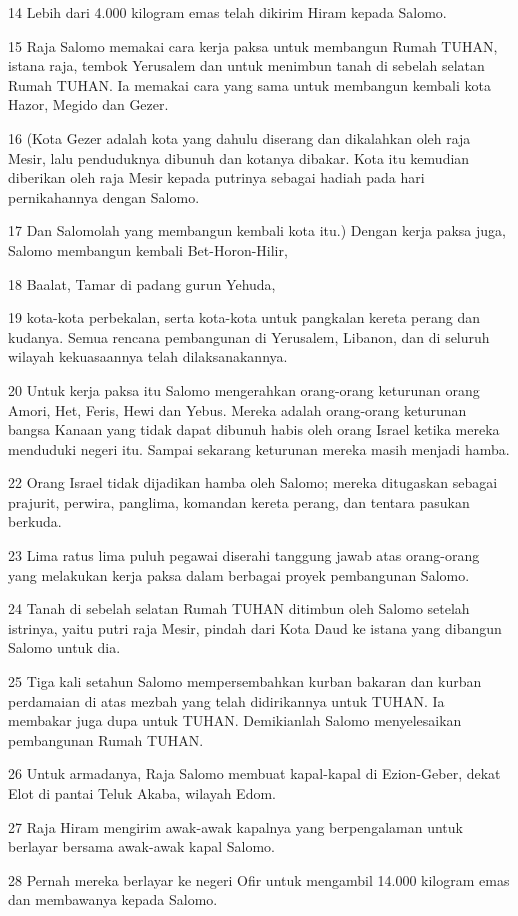 \par 14 Lebih dari 4.000 kilogram emas telah dikirim Hiram kepada Salomo.
\par 15 Raja Salomo memakai cara kerja paksa untuk membangun Rumah TUHAN, istana raja, tembok Yerusalem dan untuk menimbun tanah di sebelah selatan Rumah TUHAN. Ia memakai cara yang sama untuk membangun kembali kota Hazor, Megido dan Gezer.
\par 16 (Kota Gezer adalah kota yang dahulu diserang dan dikalahkan oleh raja Mesir, lalu penduduknya dibunuh dan kotanya dibakar. Kota itu kemudian diberikan oleh raja Mesir kepada putrinya sebagai hadiah pada hari pernikahannya dengan Salomo.
\par 17 Dan Salomolah yang membangun kembali kota itu.) Dengan kerja paksa juga, Salomo membangun kembali Bet-Horon-Hilir,
\par 18 Baalat, Tamar di padang gurun Yehuda,
\par 19 kota-kota perbekalan, serta kota-kota untuk pangkalan kereta perang dan kudanya. Semua rencana pembangunan di Yerusalem, Libanon, dan di seluruh wilayah kekuasaannya telah dilaksanakannya.
\par 20 Untuk kerja paksa itu Salomo mengerahkan orang-orang keturunan orang Amori, Het, Feris, Hewi dan Yebus. Mereka adalah orang-orang keturunan bangsa Kanaan yang tidak dapat dibunuh habis oleh orang Israel ketika mereka menduduki negeri itu. Sampai sekarang keturunan mereka masih menjadi hamba.
\par 22 Orang Israel tidak dijadikan hamba oleh Salomo; mereka ditugaskan sebagai prajurit, perwira, panglima, komandan kereta perang, dan tentara pasukan berkuda.
\par 23 Lima ratus lima puluh pegawai diserahi tanggung jawab atas orang-orang yang melakukan kerja paksa dalam berbagai proyek pembangunan Salomo.
\par 24 Tanah di sebelah selatan Rumah TUHAN ditimbun oleh Salomo setelah istrinya, yaitu putri raja Mesir, pindah dari Kota Daud ke istana yang dibangun Salomo untuk dia.
\par 25 Tiga kali setahun Salomo mempersembahkan kurban bakaran dan kurban perdamaian di atas mezbah yang telah didirikannya untuk TUHAN. Ia membakar juga dupa untuk TUHAN. Demikianlah Salomo menyelesaikan pembangunan Rumah TUHAN.
\par 26 Untuk armadanya, Raja Salomo membuat kapal-kapal di Ezion-Geber, dekat Elot di pantai Teluk Akaba, wilayah Edom.
\par 27 Raja Hiram mengirim awak-awak kapalnya yang berpengalaman untuk berlayar bersama awak-awak kapal Salomo.
\par 28 Pernah mereka berlayar ke negeri Ofir untuk mengambil 14.000 kilogram emas dan membawanya kepada Salomo.

